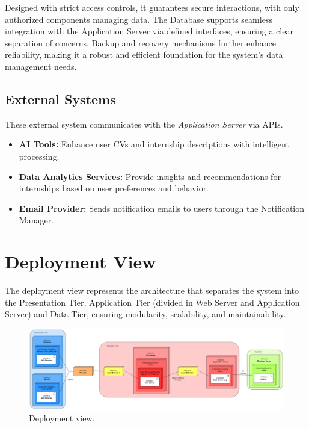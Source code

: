 Designed with strict access controls, it guarantees secure interactions, with only authorized components managing data. The Database supports seamless integration with the Application Server via defined interfaces, ensuring a clear separation of concerns. Backup and recovery mechanisms further enhance reliability, making it a robust and efficient foundation for the system's data management needs.

\subsection{External Systems}
\label{subsec:external_systems}%

These external system communicates with the \textit{Application Server} via APIs.

\begin{itemize}
    \item
        \textbf{AI Tools:} Enhance user CVs and internship descriptions with intelligent processing.
    \item
        \textbf{Data Analytics Services:} Provide insights and recommendations for internships based on user preferences and behavior.
        \item 
        \textbf{Email Provider:} Sends notification emails to users through the Notification Manager.
\end{itemize}

\newpage 

\section{Deployment View}
\label{sec:deployment_view}

The deployment view represents the architecture that separates the system into the Presentation Tier, Application Tier (divided in Web Server and Application Server) and Data Tier, ensuring modularity, scalability, and maintainability.

\begin{figure}[H]
    \centering
    \includegraphics[width=\linewidth]{DD/Images/deploymentView.png}
    \caption{Deployment view.}
    \label{fig:deployment_view}
\end{figure}

